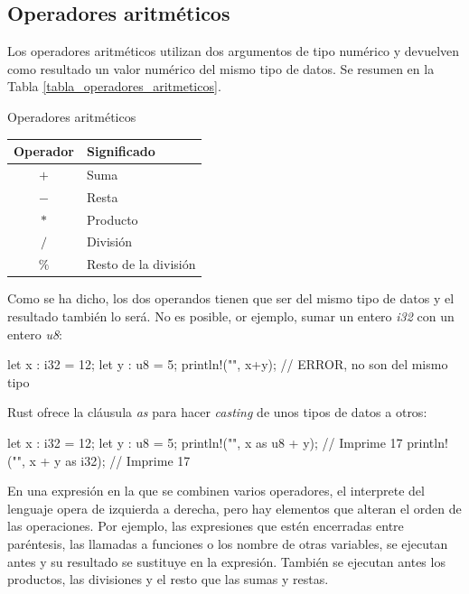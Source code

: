 \subsection{Operadores aritméticos}
\noindent Los operadores aritméticos utilizan dos argumentos de tipo numérico y devuelven como resultado un valor numérico del mismo tipo de datos. Se resumen en la Tabla \ref{tabla_operadores_aritmeticos}.

\begin{center}
   \begin{mytable}[label=tabla_operadores_aritmeticos]{\centering\footnotesize Operadores aritméticos}
      \footnotesize
      \begin{tabular}{c l}
         \hline
         \textbf{Operador} & \textbf{Significado} \\ \hline
         $+$ & Suma \\
         $-$ & Resta \\
         $*$ & Producto \\
         $/$ & División \\
         $\%$ & Resto de la división \\
      \end{tabular}
   \end{mytable}
\end{center}


Como se ha dicho, los dos operandos tienen que ser del mismo tipo de datos y el resultado también lo será. No es posible, or ejemplo, sumar un entero \textit{i32} con un entero \textit{u8}:

\vspace{0.7em}
\begin{Codigo}
let x : i32 = 12;
let y : u8 = 5;
println!("{}", x+y); // ERROR, no son del mismo tipo
\end{Codigo}

Rust ofrece la cláusula \textit{as} para hacer \textit{casting} de unos tipos de datos a otros:

\vspace{0.7em}
\begin{Codigo}
let x : i32 = 12;
let y : u8 = 5;
println!("{}", x as u8 + y); // Imprime 17
println!("{}", x + y as i32); // Imprime 17
\end{Codigo}

En una expresión en la que se combinen varios operadores, el interprete del lenguaje opera de izquierda a derecha, pero hay elementos que alteran el orden de las operaciones. Por ejemplo, las expresiones que estén encerradas entre paréntesis, las llamadas a funciones o los nombre de otras variables, se ejecutan antes y su resultado se sustituye en la expresión. También se ejecutan antes los productos, las divisiones y el resto que las sumas y restas. 

